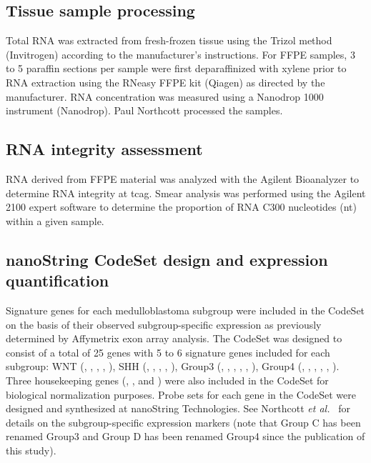 \subsection{Tissue sample processing}

Total RNA was extracted from fresh-frozen tissue using the Trizol method (Invitrogen) according to the manufacturer’s instructions.  For FFPE samples, 3 to 5 paraffin sections per sample were first deparaffinized with xylene prior to RNA extraction using the RNeasy FFPE kit (Qiagen) as directed by the manufacturer.  RNA concentration was measured using a Nanodrop 1000 instrument (Nanodrop). Paul Northcott processed the samples.

\subsection{RNA integrity assessment}

RNA derived from FFPE material was analyzed with the Agilent Bioanalyzer to determine RNA integrity at \gls{tcag}. Smear analysis was performed using the Agilent 2100 expert software to determine the proportion of RNA C300 nucleotides (nt) within a given sample.

\subsection{nanoString CodeSet design and expression quantification}

Signature genes for each medulloblastoma subgroup were included in the CodeSet on the basis of their observed subgroup-specific expression as previously determined by Affymetrix exon array analysis.  The CodeSet was designed to consist of a total of 25 genes with 5 to 6 signature genes included for each subgroup: WNT (, , , , ), SHH (, , , , ), Group3 (, , , , , ), Group4 (, , , , , ).  Three housekeeping genes (, , and ) were also included in the CodeSet for biological normalization purposes.  Probe sets for each gene in the CodeSet were designed and synthesized at nanoString Technologies. See Northcott \emph{et al.}\  for details on the subgroup-specific expression markers (note that Group C has been renamed Group3 and Group D has been renamed Group4 since the publication of this study).

